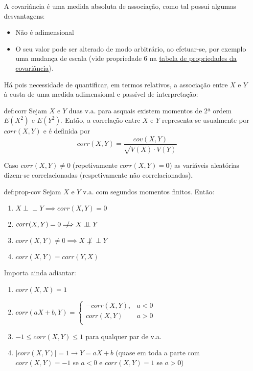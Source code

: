 \noindent A covariância é uma medida absoluta de associação, como tal possui algumas desvantagens:
\begin{itemize}
    \item Não é adimensional
    \item O seu valor pode ser alterado de modo arbitrário, ao efetuar-se, por exemplo uma mudança de escala (vide propriedade 6 na \hyperref[def:prop-cov]{tabela de propriedades da covariância}).
\end{itemize}
\noindent Há pois necessidade de quantificar, em termos relativos, a associação entre $X$ e $Y$ à custa de uma medida adimensional e passível de interpretação:

\newpage
\begin{theo}{def:corr}\label{def:corr}
    \noindent Sejam $X$ e $Y$ duas v.a. para asquais existem momentos de 2ª ordem $E(X^2)$ e $E(Y^2)$. Então, a correlação entre $X$ e $Y$ representa-se usualmente por $corr(X,Y)$ e é definida por
    $$
        corr(X,Y) = \dfrac{cov(X,Y)}{\sqrt{V(X)\cdot V(Y)}}
    $$

    \noindent Caso $corr(X,Y) \ne 0$ (repetivamente $corr(X,Y) = 0$) as variáveis aleatórias dizem-se correlacionadas (respetivamente não correlacionadas).
\end{theo}

\begin{theo}{def:prop-cov}\label{def:prop-cov}
    \noindent Sejam $X$ e $Y$ v.a. com segundos momentos finitos. Então:
    \begin{enumerate}
        \item $X\perp \!\!\! \perp Y \implies corr(X,Y) = 0$ 
        \item $corr(X,Y) = 0 \mathrel{\rlap{\hskip .5em/}}\Longrightarrow X\perp \!\!\! \perp Y$
        \item $corr(X,Y) \ne 0 \implies X \not\perp \!\!\! \perp Y$
        \item $corr(X,Y) = corr(Y,X)$
    \end{enumerate}

    \noindent Importa ainda adiantar:
    \begin{enumerate}
        \item $corr(X,X) = 1$
        \item $corr(aX + b,Y) = \left\{
                                \begin{array}{ll}
                                      -corr(X,Y), & a < 0\\
                                       corr(X,Y) & a > 0\\
                                \end{array} 
                          \right.$
        \item $-1 \leq corr(X,Y) \leq 1$ para qualquer par de v.a.
        \item $|corr(X,Y)| = 1 \xrightarrow{} Y = aX + b$ (quase em toda a parte com $corr(X,Y) = -1$ se $a < 0$ e $corr(X,Y) = 1$ se $a > 0$)
    \end{enumerate}
\end{theo}

